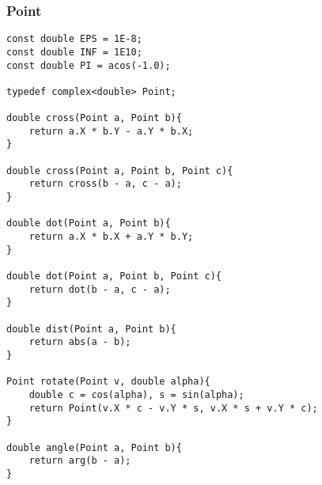 \subsubsection{Point}
\begin{verbatim}
const double EPS = 1E-8;
const double INF = 1E10;
const double PI = acos(-1.0);

typedef complex<double> Point;

double cross(Point a, Point b){
	return a.X * b.Y - a.Y * b.X;
}

double cross(Point a, Point b, Point c){
	return cross(b - a, c - a);
}

double dot(Point a, Point b){
	return a.X * b.X + a.Y * b.Y;
}

double dot(Point a, Point b, Point c){
	return dot(b - a, c - a);
}

double dist(Point a, Point b){
	return abs(a - b);
}

Point rotate(Point v, double alpha){
	double c = cos(alpha), s = sin(alpha);
	return Point(v.X * c - v.Y * s, v.X * s + v.Y * c);
}

double angle(Point a, Point b){
	return arg(b - a);
}
\end{verbatim}
